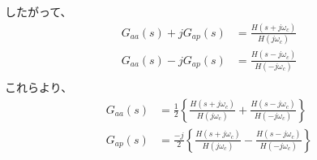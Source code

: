 \documentclass[book]{jlreq}
\begin{document}
%
したがって、
%
\begin{equation}
    \begin{split}
        G_{aa}(s) + j G_{ap}(s) &= \frac{H(s+j\omega_c)}{H(j\omega_c)} \\
        G_{aa}(s) - j G_{ap}(s) &= \frac{H(s-j\omega_c)}{H(-j\omega_c)} \\
    \end{split}
\end{equation}
%
これらより、
%
\begin{equation}
    \begin{split}
        G_{aa}(s) &= \frac{1}{2}\left\{\frac{H(s+j\omega_c)}{H(j\omega_c)} + \frac{H(s-j\omega_c)}{H(-j\omega_c)}\right\} \\
        G_{ap}(s) &= \frac{-j}{2}\left\{\frac{H(s+j\omega_c)}{H(j\omega_c)} - \frac{H(s-j\omega_c)}{H(-j\omega_c)}\right\}
    \end{split}
\end{equation}
%
\end{document}
